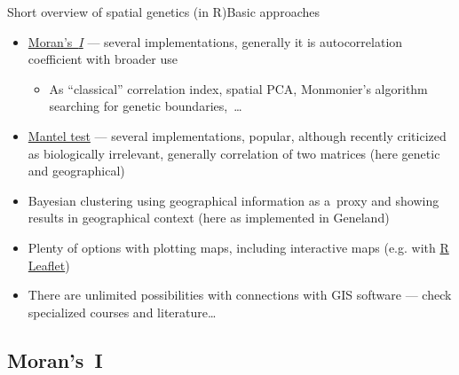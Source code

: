 \documentclass[compress, ucs, xelatex, 11pt, xcolor=svgnames, aspectratio=169,
	hyperref={
		bookmarks=true,
		unicode=true,
		colorlinks=true,
		pdftitle={Molecular data in R},
		plainpages=false,
		pdfauthor={Vojtech Zeisek},
		pdfsubject={Course about phylogeny and evolution in R},
		pdfcreator={XeLaTeX},
		pdfkeywords={R, evolution, phylogeny, molecular data},
		linkcolor=Crimson, %
		anchorcolor=Magenta, %
		citecolor=Magenta, %
		filecolor=Magenta, %
		menucolor=Magenta, %
		urlcolor=DodgerBlue, %
		pdftex},
	url={hyphens, lowtilde} %
	]{beamer}
\begin{document}
\begin{frame}{Short overview of spatial genetics (in R)}{Basic approaches}
	\begin{itemize}
		\item \href{https://en.wikipedia.org/wiki/Moran\%27s_I}{Moran's~\textit{I}} --- several implementations, generally it is autocorrelation coefficient with broader use
		\begin{itemize}
		 \item As \enquote{classical} correlation index, spatial PCA, Monmonier's algorithm searching for genetic boundaries,~\ldots
		\end{itemize}
		\item \href{https://en.wikipedia.org/wiki/Mantel_test}{Mantel test} --- several implementations, popular, although recently criticized as biologically irrelevant, generally correlation of two matrices (here genetic and geographical)
		\item Bayesian clustering using geographical information as a~proxy and showing results in geographical context (here as implemented in Geneland)
		\item Plenty of options with plotting maps, including interactive maps (e.g. with \href{https://rstudio.github.io/leaflet/}{R Leaflet})
		\item There are unlimited possibilities with connections with GIS software --- check specialized courses and literature\ldots
	\end{itemize}
\end{frame}

\subsection{Moran's~I}
\end{document}
